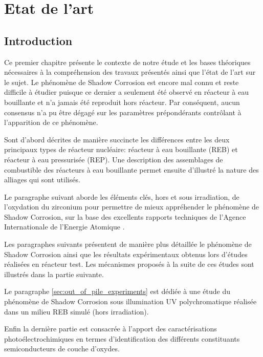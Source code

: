 

\chapter{Etat de l'art}\label{chap:ch1_bib}

\begin{refsection}
\minitoc

\section{Introduction}
    Ce premier chapitre présente le contexte de notre étude et les bases théoriques nécessaires à la compréhension des travaux
    présentés ainsi que l'état de l'art sur le sujet. Le phénomène de Shadow Corrosion est encore mal connu et reste difficile à étudier puisque ce
    dernier a seulement été observé en réacteur à eau bouillante et n'a jamais été reproduit hors réacteur. Par conséquent, aucun
    consensus n'a pu être dégagé sur les paramètres prépondérants contrôlant à l'apparition de ce phénomène.
    
    Sont d'abord décrites de manière succincte les différences entre les deux principaux types de réacteur
    nucléaire: réacteur à eau bouillante (REB) et réacteur à eau pressurisée (REP). Une description des assemblages de combustible
    des réacteurs à eau bouillante permet ensuite d'illustré la nature des alliages qui sont utilisés.
    
    Le paragraphe suivant aborde les éléments clés, hors et sous irradiation, de l'oxydation du
    zirconium pour permettre de mieux appréhender le phénomène de
    Shadow Corrosion, sur la base des excellents rapports techniques de l'Agence
    Internationale de l'Energie Atomique \citep{IAEA1993, IAEA1998}.
    
    Les paragraphes suivants présentent de manière plus détaillée le phénomène de Shadow Corrosion ainsi que
    les résultats expérimentaux obtenus lors d'études réalisées en réacteur test. Les mécanismes proposés à la suite de
    ces études sont illustrés dans la partie suivante.
    
    Le paragraphe \ref{sec:out_of_pile_experiments} est dédiée à une étude du phénomène de Shadow Corrosion 
    sous illumination UV polychromatique réalisée dans un milieu REB simulé (hors irradiation).  
    
    Enfin la dernière partie est consacrée à l'apport des caractérisations photoélectrochimiques en termes
    d'identification des différents constituants semiconducteurs de couche d'oxydes.


\end{refsection}
